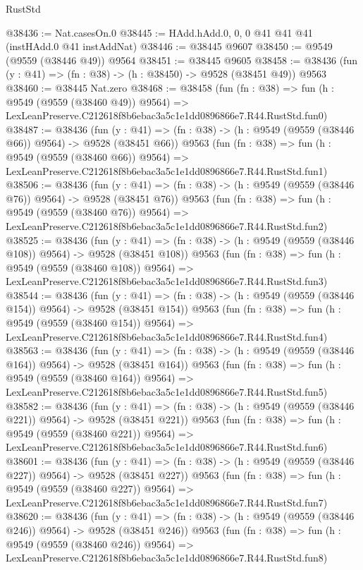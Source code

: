 \begin{lexlean}{RustStd}
\begin{coremodule}
@38436 := Nat.casesOn.{0}
@38445 := HAdd.hAdd.{0, 0, 0} @41 @41 @41 (instHAdd.{0} @41 instAddNat)
@38446 := @38445 @9607
@38450 := @9549 (@9559 (@38446 @49)) @9564
@38451 := @38445 @9605
@38458 := @38436 (fun (y : @41) => (fn : @38) -> (h : @38450) -> @9528 (@38451 @49)) @9563
@38460 := @38445 Nat.zero
@38468 := @38458
    (fun (fn : @38) =>
    fun (h : @9549 (@9559 (@38460 @49)) @9564) =>
    LexLeanPreserve.C212618f8b6ebac3a5c1e1dd0896866e7.R44.RustStd.fun0)
@38487 := @38436
    (fun (y : @41) => (fn : @38) -> (h : @9549 (@9559 (@38446 @66)) @9564) -> @9528 (@38451 @66))
    @9563
    (fun (fn : @38) =>
    fun (h : @9549 (@9559 (@38460 @66)) @9564) =>
    LexLeanPreserve.C212618f8b6ebac3a5c1e1dd0896866e7.R44.RustStd.fun1)
@38506 := @38436
    (fun (y : @41) => (fn : @38) -> (h : @9549 (@9559 (@38446 @76)) @9564) -> @9528 (@38451 @76))
    @9563
    (fun (fn : @38) =>
    fun (h : @9549 (@9559 (@38460 @76)) @9564) =>
    LexLeanPreserve.C212618f8b6ebac3a5c1e1dd0896866e7.R44.RustStd.fun2)
@38525 := @38436
    (fun (y : @41) => (fn : @38) -> (h : @9549 (@9559 (@38446 @108)) @9564) -> @9528 (@38451 @108))
    @9563
    (fun (fn : @38) =>
    fun (h : @9549 (@9559 (@38460 @108)) @9564) =>
    LexLeanPreserve.C212618f8b6ebac3a5c1e1dd0896866e7.R44.RustStd.fun3)
@38544 := @38436
    (fun (y : @41) => (fn : @38) -> (h : @9549 (@9559 (@38446 @154)) @9564) -> @9528 (@38451 @154))
    @9563
    (fun (fn : @38) =>
    fun (h : @9549 (@9559 (@38460 @154)) @9564) =>
    LexLeanPreserve.C212618f8b6ebac3a5c1e1dd0896866e7.R44.RustStd.fun4)
@38563 := @38436
    (fun (y : @41) => (fn : @38) -> (h : @9549 (@9559 (@38446 @164)) @9564) -> @9528 (@38451 @164))
    @9563
    (fun (fn : @38) =>
    fun (h : @9549 (@9559 (@38460 @164)) @9564) =>
    LexLeanPreserve.C212618f8b6ebac3a5c1e1dd0896866e7.R44.RustStd.fun5)
@38582 := @38436
    (fun (y : @41) => (fn : @38) -> (h : @9549 (@9559 (@38446 @221)) @9564) -> @9528 (@38451 @221))
    @9563
    (fun (fn : @38) =>
    fun (h : @9549 (@9559 (@38460 @221)) @9564) =>
    LexLeanPreserve.C212618f8b6ebac3a5c1e1dd0896866e7.R44.RustStd.fun6)
@38601 := @38436
    (fun (y : @41) => (fn : @38) -> (h : @9549 (@9559 (@38446 @227)) @9564) -> @9528 (@38451 @227))
    @9563
    (fun (fn : @38) =>
    fun (h : @9549 (@9559 (@38460 @227)) @9564) =>
    LexLeanPreserve.C212618f8b6ebac3a5c1e1dd0896866e7.R44.RustStd.fun7)
@38620 := @38436
    (fun (y : @41) => (fn : @38) -> (h : @9549 (@9559 (@38446 @246)) @9564) -> @9528 (@38451 @246))
    @9563
    (fun (fn : @38) =>
    fun (h : @9549 (@9559 (@38460 @246)) @9564) =>
    LexLeanPreserve.C212618f8b6ebac3a5c1e1dd0896866e7.R44.RustStd.fun8)

\end{coremodule}
\end{lexlean}
